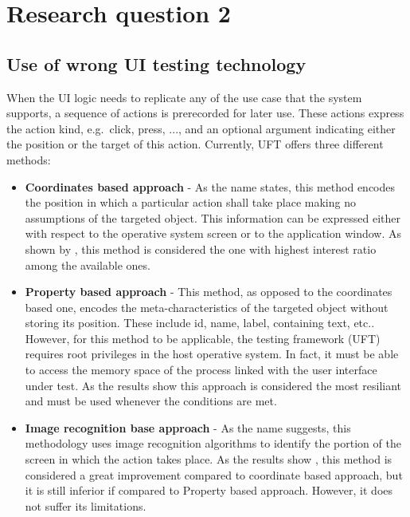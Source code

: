 \section{Research question 2} \label{sec:disc-rq2}

    \subsection{Use of wrong UI testing technology}

    When the UI logic needs to replicate any of the use case that the system supports, a sequence of actions is prerecorded for later use. These actions express the action kind, e.g.\ click, press, ..., and an optional argument indicating either the position or the target of this action. Currently, UFT offers three different methods:

\begin{itemize}

\item{\textbf{Coordinates based approach}} - As the name states, this method encodes the position in which a particular action shall take place making no assumptions of the targeted object. This information can be expressed either with respect to the operative system screen or to the application window. As shown by , this method is considered the one with highest interest ratio among the available ones.

\item{\textbf{Property based approach}} - This method, as opposed to the coordinates based one, encodes the meta-characteristics of the targeted object without storing its position. These include id, name, label, containing text, etc.. However, for this method to be applicable, the testing framework (UFT) requires root privileges in the host operative system. In fact, it must be able to access the memory space of the process linked with the user interface under test. As the results show  this approach is considered the most resiliant and must be used whenever the conditions are met.

\item{\textbf{Image recognition base approach}} - As the name suggests, this methodology uses image recognition algorithms to identify the portion of the screen in which the action takes place. As the results show , this method is considered a great improvement compared to coordinate based approach, but it is still inferior if compared to Property based approach. However, it does not suffer its limitations.

\end{itemize}

